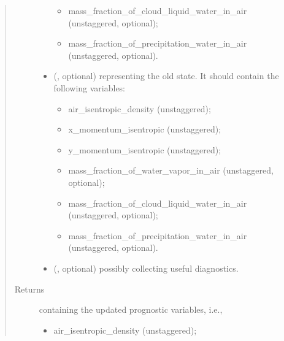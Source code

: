 \documentclass[letterpaper,10pt,english]{sphinxmanual}
\begin{document}
\begin{fulllineitems}
\begin{fulllineitems}
\begin{quote}
\begin{description}
\begin{itemize}
\begin{itemize}
\item {} 
mass\_fraction\_of\_cloud\_liquid\_water\_in\_air (unstaggered, optional);

\item {} 
mass\_fraction\_of\_precipitation\_water\_in\_air (unstaggered, optional).

\end{itemize}


\item {} 
 (, optional) \textendash{} 
{\hyperref[\detokenize{api:storages.state_isentropic.StateIsentropic}]{}} representing the old state.
It should contain the following variables:
\begin{itemize}
\item {} 
air\_isentropic\_density (unstaggered);

\item {} 
x\_momentum\_isentropic (unstaggered);

\item {} 
y\_momentum\_isentropic (unstaggered);

\item {} 
mass\_fraction\_of\_water\_vapor\_in\_air (unstaggered, optional);

\item {} 
mass\_fraction\_of\_cloud\_liquid\_water\_in\_air (unstaggered, optional);

\item {} 
mass\_fraction\_of\_precipitation\_water\_in\_air (unstaggered, optional).

\end{itemize}


\item {} 
 (, optional) \textendash{} {\hyperref[\detokenize{api:storages.grid_data.GridData}]{}} possibly collecting useful diagnostics.

\end{itemize}

\item[{Returns}] \leavevmode

{\hyperref[\detokenize{api:storages.state_isentropic.StateIsentropic}]{}} containing the updated prognostic variables, i.e.,
\begin{itemize}
\item {} 
air\_isentropic\_density (unstaggered);


\end{itemize}
\end{description}
\end{quote}
\end{fulllineitems}
\end{fulllineitems}
\end{document}
